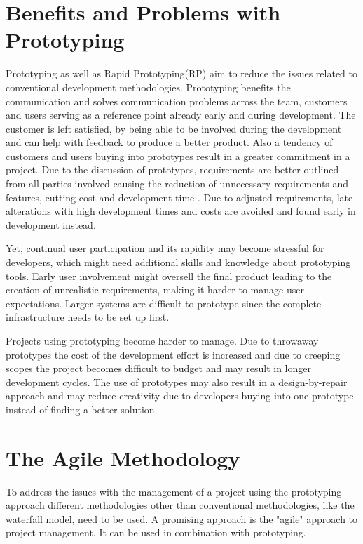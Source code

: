 \documentclass[runningheads]{llncs}
\begin{document}
\section{Benefits and Problems with Prototyping}
Prototyping as well as Rapid Prototyping(RP) aim to reduce the issues related to conventional development methodologies. Prototyping
benefits the communication and solves communication problems across the team, customers and users\cite{ref_RPalternativeStrategy} serving as a reference point already 
early and during development\cite{ref_prac}. The customer is left satisfied, by being able to be involved during the development 
and can help with feedback to produce a better product. Also a tendency of customers and users buying into prototypes result in a greater
commitment in a project. Due to the discussion of prototypes, requirements are better outlined from all parties involved causing the reduction
of unnecessary requirements and features, cutting cost and development time \cite{ref_prac}. Due to adjusted requirements, 
late alterations with high development times and costs are avoided and found early in development instead.

Yet, continual user participation and its rapidity may become stressful for developers, which might need additional skills and knowledge about
prototyping tools. Early user involvement might oversell the final product leading to the creation of unrealistic requirements, making it harder 
to manage user expectations. Larger systems are difficult to prototype since the complete infrastructure needs to be set up first\cite{ref_prac}.

Projects using prototyping become harder to manage. Due to throwaway prototypes the cost of the development effort is increased 
and due to creeping scopes\cite{ref_featurecreep} the project becomes difficult to budget and may result in longer development cycles. 
The use of prototypes may also result in a design-by-repair approach and may reduce creativity due to developers buying into one 
prototype instead of finding a better solution.

\section{The Agile Methodology}
To address the issues with the management of a project using the prototyping approach different methodologies other than 
conventional methodologies, like the waterfall model, need to be used. A promising approach is the "agile" approach
to project management. It can be used in combination with prototyping.
\end{document}
